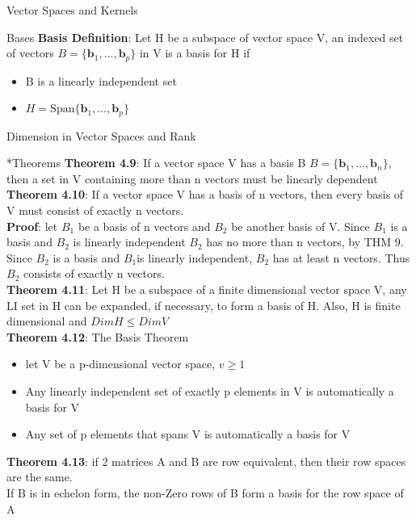 \documentclass[a4paper, 12pt]{article}
\begin{document}
\begin{section}{Vector Spaces and Kernels}
\begin{subsection}{Bases}
\textbf{Basis Definition}: Let H be a subspace of vector space V,
an indexed set of vectors
$B=\{\textbf{b}_{1},\dots,\textbf{b}_{p}\}$ in V is a basis for H if
\begin{itemize}
\item{B is a linearly independent set}
\item{$H=\mbox{Span}\{\textbf{b}_{1},\dots,\textbf{b}_{p}\}$}
\end{itemize}
\end{subsection} \end{section}

\newpage
\begin{section}{Dimension in Vector Spaces and Rank}
\begin{subsection}*{Theorems}
\textbf{Theorem 4.9}: If a vector space V has a basis B
$B=\{\textbf{b}_{1},\dots,\textbf{b}_{n}\}$, then a set in V 
containing more than n vectors must be linearly dependent\\
\noindent\textbf{Theorem 4.10}: If a vector space V has a basis of
n vectors, then every basis of V must consist of exactly n vectors.
\\ \textbf{Proof}: let $B_1$ be a basis of n vectors and $B_2$ 
be another basis of V. Since $B_1$ is a basis and $B_2$ 
is linearly independent $B_2$ has no more than n vectors, by THM 9.
Since $B_2$ is a basis and $B_1$is linearly independent, $B_2$ 
has at least n vectors. Thus $B_2$ consists of exactly n vectors.
\\ \noindent \textbf{Theorem 4.11}:  Let H be a subspace of a finite
dimensional vector space V, any LI set in H can be expanded, if 
necessary, to form a basis of H. Also, H is finite dimensional and
$DimH \leq DimV$
\\ \noindent \textbf{Theorem 4.12}: The Basis Theorem\\
\begin{itemize}
\item{let V be a p-dimensional vector space, $v\geq 1$}
\item{Any linearly independent set of exactly p elements in V is automatically a 
	basis for V}
\item{Any set of p elements that spans V is automatically a basis for V}
\end{itemize}
\noindent \textbf{Theorem 4.13}: if 2 matrices A and B are row equivalent, then 
their row spaces are the same. \\
If B is in echelon form, the non-Zero rows of B form a basis for the row space of A

\end{subsection}
\end{section}
\end{document}
